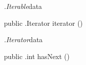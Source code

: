 \begin{CrexxClass}{\textit{.Iterable}}{data}

  \begin{Hierarchy}
  \end{Hierarchy}

  \begin{Members}

    \Method
      {public}
      {.Iterator}
      {iterator}
      {()}

  \end{Members}
\end{CrexxClass}

\begin{CrexxClass}{\textit{.Iterator}}{data}

  \begin{Hierarchy}
  \end{Hierarchy}

  \begin{Members}

    \Method
      {public}
      {.int}
      {hasNext}
      {()}

  \end{Members}
\end{CrexxClass}

